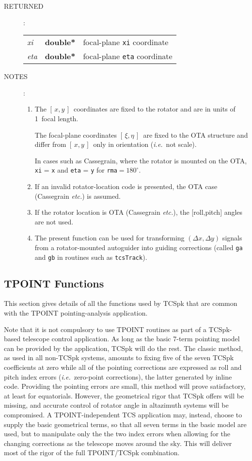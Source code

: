 \documentclass[12pt,fleqn,twoside]{article}
\renewcommand{\_}{{\tt\char'137}}     %
\newcommand{\xieta}     {$[\,\xi,\eta\,]$}
\newcommand{\xy}        {$[\,x,y\,]$}
\newcommand{\args}[2]
{
  \goodbreak
  \begin{description}
  \item[#1]: \\[1.5ex] \nopagebreak
    \hspace*{-0.9em}
    \begin{tabular}{p{4.5em}p{5.8em}p{23.5em}}
      #2
    \end{tabular}
  \end{description}
  \vspace{-3ex}
}
\newcommand{\spec}[3]
{
  {\em {#1}} & {\bf \mbox{#2}} & {#3}
}
\newcommand{\notes}[1]
{
  \goodbreak
  \begin{description}
    \item[NOTES]: \nopagebreak
        #1
  \end{description}
  \vspace{-3ex}
}
\begin{document}
\args{RETURNED}
{
\spec{xi}{double*}{focal-plane {\tt xi} coordinate} \\
\spec{eta}{double*}{focal-plane {\tt eta} coordinate}
}
\notes{
\begin{enumerate}
\setlength{\parskip}{\medskipamount}
\item The \xy\ coordinates are fixed to the rotator and are in units of
      1~focal length.

      The focal-plane coordinates \xieta\ are fixed to the OTA structure
      and differ from \xy\ only in orientation ({\it i.e.}~not scale).

      In cases such as Cassegrain,
      where the rotator is mounted on the OTA,
      {\tt xi} = {\tt x} and {\tt eta} = {\tt y}
      for {\tt rma}$ = 180^\circ$.
\item If an invalid rotator-location code is presented, the OTA case
      (Cassegrain {\it etc.}) is assumed.
\item If the rotator location is OTA (Cassegrain {\it etc.}),
      the [roll,pitch] angles are not used.
\item The present function can be used for transforming
      $(\Delta x, \Delta y)$ signals from a
      rotator-mounted autoguider into guiding corrections (called
      {\tt ga} and {\tt gb} in routines such as {\tt tcsTrack}).
\end{enumerate}
}

\newpage
\fi

\subsection{TPOINT Functions}

This section gives details of all the functions used by TCSpk that
are common with the TPOINT pointing-analysis application.

Note that it is not compulsory to use TPOINT routines as part of a
TCSpk-based telescope control application.  As long as the basic
7-term pointing model can be provided by the application, TCSpk will
do the rest.  The classic method, as used in all non-TCSpk systems,
amounts to fixing five of the seven TCSpk coefficients at zero while all of
the pointing corrections are expressed as roll and pitch index
errors ({\it i.e.}~zero-point corrections), the latter generated
by inline code.  Providing the pointing errors are small, this
method will prove satisfactory, at least for equatorials.  However,
the geometrical rigor that TCSpk offers will be missing, and accurate
control of rotator angle in altazimuth systems will be compromised.
A TPOINT-independent TCS application may, instead, choose to supply
the basic geometrical terms, so that all seven terms in the basic
model are used, but to manipulate only the the two index
errors when allowing for the changing corrections as the
telescope moves around the sky.  This will deliver most of the
rigor of the full TPOINT/TCSpk combination.
\end{document}
